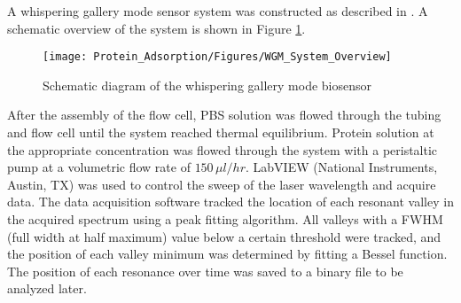 A whispering gallery mode sensor system was constructed as described
in \cite{Wilson2011,Wilson2009}. A schematic overview of the system
is shown in Figure \ref{fig:WGM System Diagram}.%
\begin{figure}
\texttt{[image: Protein\_Adsorption/Figures/WGM\_System\_Overview]}

\caption{\label{fig:WGM System Diagram}Schematic diagram of the whispering
gallery mode biosensor}


%
\end{figure}
 After the assembly of the flow cell, PBS solution was flowed through
the tubing and flow cell until the system reached thermal equilibrium.
Protein solution at the appropriate concentration was flowed through
the system with a peristaltic pump at a volumetric flow rate of $150\,\mu l/hr$.
LabVIEW (National Instruments, Austin, TX) was used to control the
sweep of the laser wavelength and acquire data. The data acquisition
software tracked the location of each resonant valley in the acquired
spectrum using a peak fitting algorithm. All valleys with a FWHM (full
width at half maximum) value below a certain threshold were tracked,
and the position of each valley minimum was determined by fitting
a Bessel function. The position of each resonance over time was saved
to a binary file to be analyzed later.

